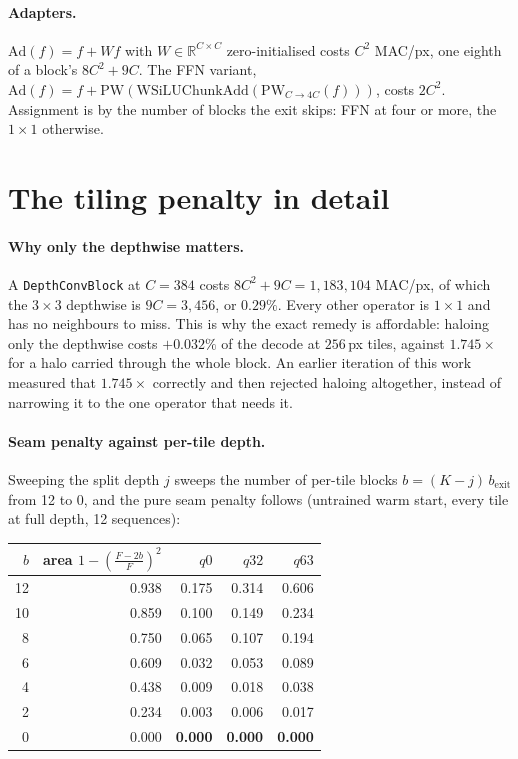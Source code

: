 \paragraph{Adapters.} $\mathrm{Ad}(f) = f + Wf$ with $W\in\mathbb{R}^{C\times C}$
zero-initialised costs $C^2$ MAC/px, one eighth of a block's $8C^2 + 9C$. The
FFN variant, $\mathrm{Ad}(f)=f+\mathrm{PW}(\mathrm{WSiLUChunkAdd}
(\mathrm{PW}_{C\to 4C}(f)))$, costs $2C^2$. Assignment is by the number of blocks
the exit skips: FFN at four or more, the $1\times1$ otherwise.

\section{The tiling penalty in detail}

\paragraph{Why only the depthwise matters.} A \texttt{DepthConvBlock} at $C=384$
costs $8C^2 + 9C = 1{,}183{,}104$ MAC/px, of which the $3\times3$ depthwise is
$9C = 3{,}456$, or $0.29\%$. Every other operator is $1\times1$ and has no
neighbours to miss. This is why the exact remedy is affordable: haloing
only the depthwise costs $+0.032\%$ of the decode at $256$\,px tiles,
against $1.745\times$ for a halo carried through the whole block. An earlier
iteration of this work measured that $1.745\times$ correctly and then rejected
haloing altogether, instead of narrowing it to the one operator that needs it.

\paragraph{Seam penalty against per-tile depth.} Sweeping the split depth $j$
sweeps the number of per-tile blocks $b = (K-j)\,b_{\mathrm{exit}}$ from 12 to
0, and the pure seam penalty follows (untrained warm start, every tile at full
depth, 12 sequences):

\begin{center}
\begin{tabular}{rrrrr}
\toprule
$b$ & area $1-(\frac{F-2b}{F})^2$ & $q0$ & $q32$ & $q63$ \\
\midrule
12 & 0.938 & 0.175 & 0.314 & 0.606 \\
10 & 0.859 & 0.100 & 0.149 & 0.234 \\
 8 & 0.750 & 0.065 & 0.107 & 0.194 \\
 6 & 0.609 & 0.032 & 0.053 & 0.089 \\
 4 & 0.438 & 0.009 & 0.018 & 0.038 \\
 2 & 0.234 & 0.003 & 0.006 & 0.017 \\
 0 & 0.000 & \textbf{0.000} & \textbf{0.000} & \textbf{0.000} \\
\bottomrule
\end{tabular}
\end{center}

